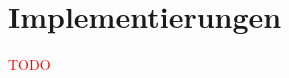 \documentclass[german,version-2019-11]{uzl-thesis}
\begin{document}
%
\appendix
\chapter{Implementierungen}

\textcolor{red}{TODO} 


%
\end{document}

